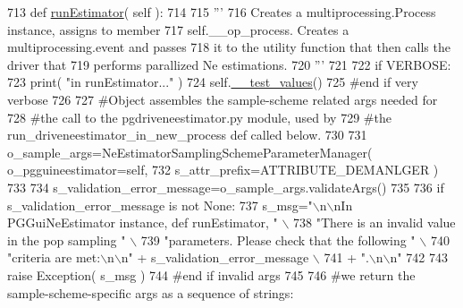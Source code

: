 \begin{DoxyCode}
713     \textcolor{keyword}{def }\hyperlink{classnegui_1_1pgguineestimator__experimental_1_1PGGuiNeEstimator_a21c83a7e246530f5f0755f59b0c5fcd5}{runEstimator}( self ):
714 
715         \textcolor{stringliteral}{'''}
716 \textcolor{stringliteral}{        Creates a multiprocessing.Process instance, assigns to member}
717 \textcolor{stringliteral}{        self.\_\_op\_process.  Creates a multiprocessing.event and passes}
718 \textcolor{stringliteral}{        it to the utility function that then calls the driver that}
719 \textcolor{stringliteral}{        performs parallized Ne estimations.}
720 \textcolor{stringliteral}{        '''}
721 
722         \textcolor{keywordflow}{if} VERBOSE:
723             print( \textcolor{stringliteral}{"in runEstimator..."} )
724             self.\hyperlink{classnegui_1_1pgguineestimator__experimental_1_1PGGuiNeEstimator_acf29a8f2d282438cca0d9f1d5081ae05}{\_\_test\_values}()
725         \textcolor{comment}{#end if very verbose}
726 
727         \textcolor{comment}{#Object assembles the sample-scheme related args needed for }
728         \textcolor{comment}{#the call to the pgdriveneestimator.py module, used by}
729         \textcolor{comment}{#the run\_driveneestimator\_in\_new\_process def called below.}
730 
731         o\_sample\_args=NeEstimatorSamplingSchemeParameterManager( o\_pgguineestimator=self, 
732                                                                     s\_attr\_prefix=ATTRIBUTE\_DEMANLGER )
733 
734         s\_validation\_error\_message=o\_sample\_args.validateArgs()
735 
736         \textcolor{keywordflow}{if} s\_validation\_error\_message \textcolor{keywordflow}{is} \textcolor{keywordflow}{not} \textcolor{keywordtype}{None}:
737             s\_msg=\textcolor{stringliteral}{"\(\backslash\)n\(\backslash\)nIn PGGuiNeEstimator instance, def runEstimator, "} \(\backslash\)
738                     \textcolor{stringliteral}{"There is an invalid value in the pop sampling "} \(\backslash\)
739                     \textcolor{stringliteral}{"parameters.  Please check that the following "} \(\backslash\)
740                     \textcolor{stringliteral}{"criteria are met:\(\backslash\)n\(\backslash\)n"} + s\_validation\_error\_message \(\backslash\)
741                     + \textcolor{stringliteral}{".\(\backslash\)n\(\backslash\)n"}
742         
743             \textcolor{keywordflow}{raise} Exception( s\_msg )
744         \textcolor{comment}{#end if invalid args}
745         
746         \textcolor{comment}{#we return the sample-scheme-specific args as a sequence of strings:}

\end{DoxyCode}
